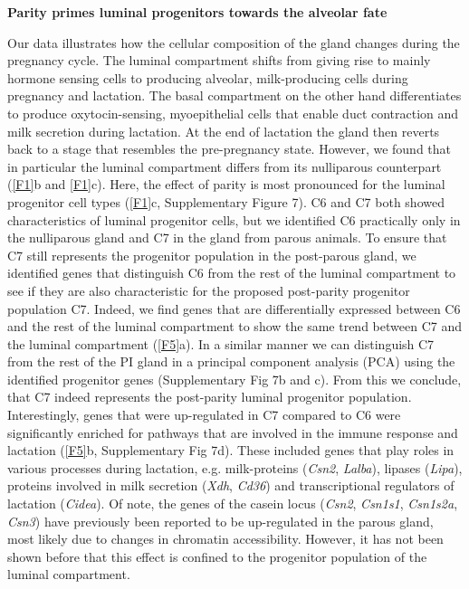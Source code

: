 \documentclass[titlepage, 12pt, oneside]{amsart}
\begin{document}
\textbf{Parity primes luminal progenitors towards the alveolar fate}

Our data illustrates how the cellular composition of the gland changes during the pregnancy cycle.
The luminal compartment shifts from giving rise to mainly hormone sensing cells to producing alveolar, milk-producing cells during pregnancy and lactation. 
The basal compartment on the other hand differentiates to produce oxytocin-sensing, myoepithelial cells that enable duct contraction and milk secretion during lactation.
At the end of lactation the gland then reverts back to a stage that resembles the pre-pregnancy state.
However, we found that in particular the luminal compartment differs from its nulliparous counterpart (\autoref{F1}b and \autoref{F1}c).
Here, the effect of parity is most pronounced for the luminal progenitor cell types (\autoref{F1}c, Supplementary Figure 7).
C6 and C7 both showed characteristics of luminal progenitor cells, but we identified C6 practically only in the nulliparous gland and C7 in the gland from parous animals.
To ensure that C7 still represents the progenitor population in the post-parous gland, we identified genes that distinguish C6 from the rest of the luminal compartment to see if they are also characteristic for the proposed post-parity progenitor population C7.
Indeed, we find genes that are differentially expressed between C6 and the rest of the luminal compartment to show the same trend between C7 and the luminal compartment (\autoref{F5}a).
In a similar manner we can distinguish C7 from the rest of the PI gland in a principal component analysis (PCA) using the identified progenitor genes (Supplementary Fig 7b and c).
From this we conclude, that C7 indeed represents the post-parity luminal progenitor population.
Interestingly, genes that were up-regulated in C7 compared to C6 were significantly enriched for pathways that are involved in the immune response and lactation (\autoref{F5}b, Supplementary Fig 7d).
These included genes that play roles in various processes during lactation, e.g. milk-proteins (\textit{Csn2}, \textit{Lalba}), lipases (\textit{Lipa}), proteins involved in milk secretion (\textit{Xdh}, \textit{Cd36}) and transcriptional regulators of lactation (\textit{Cidea})\autocite{Wang2012}.
Of note, the genes of the casein locus (\textit{Csn2}, \textit{Csn1s1}, \textit{Csn1s2a}, \textit{Csn3}) have previously been reported to be up-regulated in the parous gland, most likely due to changes in chromatin accessibility\autocite{Dos2015,Rijnkels2013}.
However, it has not been shown before that this effect is confined to the progenitor population of the luminal compartment.
\end{document}
